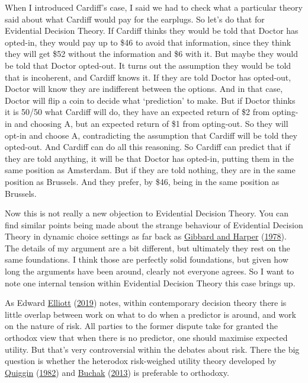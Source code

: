 \documentclass[
  12pt,
]{article}
\begin{document}
When I introduced Cardiff's case, I said we had to check what a
particular theory said about what Cardiff would pay for the earplugs. So
let's do that for Evidential Decision Theory. If Cardiff thinks they
would be told that Doctor has opted-in, they would pay up to \$46 to
avoid that information, since they think they will get \$52 without the
information and \$6 with it. But maybe they would be told that Doctor
opted-out. It turns out the assumption they would be told that is
incoherent, and Cardiff knows it. If they are told Doctor has opted-out,
Doctor will know they are indifferent between the options. And in that
case, Doctor will flip a coin to decide what `prediction' to make. But
if Doctor thinks it is 50/50 what Cardiff will do, they have an expected
return of \$2 from opting-in and choosing A, but an expected return of
\$1 from opting-out. So they will opt-in and choose A, contradicting the
assumption that Cardiff will be told they opted-out. And Cardiff can do
all this reasoning. So Cardiff can predict that if they are told
anything, it will be that Doctor has opted-in, putting them in the same
position as Amsterdam. But if they are told nothing, they are in the
same position as Brussels. And they prefer, by \$46, being in the same
position as Brussels.

Now this is not really a new objection to Evidential Decision Theory.
You can find similar points being made about the strange behaviour of
Evidential Decision Theory in dynamic choice settings as far back as
\protect\hyperlink{ref-GibbardHarper1978}{Gibbard and Harper}
(\protect\hyperlink{ref-GibbardHarper1978}{1978}). The details of my
argument are a bit different, but ultimately they rest on the same
foundations. I think those are perfectly solid foundations, but given
how long the arguments have been around, clearly not everyone agrees. So
I want to note one internal tension within Evidential Decision Theory
this case brings up.

As Edward \protect\hyperlink{ref-Elliot2019}{Elliott}
(\protect\hyperlink{ref-Elliot2019}{2019}) notes, within contemporary
decision theory there is little overlap between work on what to do when
a predictor is around, and work on the nature of risk. All parties to
the former dispute take for granted the orthodox view that when there is
no predictor, one should maximise expected utility. But that's very
controversial within the debates about risk. There the big question is
whether the heterodox risk-weighed utility theory developed by
\protect\hyperlink{ref-Quiggin1982}{Quiggin}
(\protect\hyperlink{ref-Quiggin1982}{1982}) and
\protect\hyperlink{ref-BuchakRisk}{Buchak}
(\protect\hyperlink{ref-BuchakRisk}{2013}) is preferable to orthodoxy.
\end{document}
